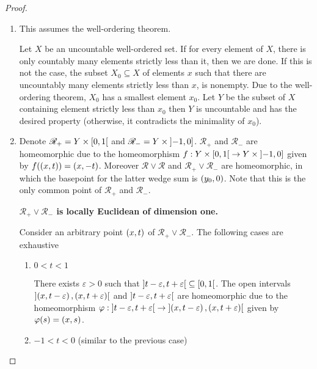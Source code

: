\begin{proof}
	\begin{enumerate}[label={(\alph*)}]
		\item This assumes the well-ordering theorem.

		      Let $X$ be an uncountable well-ordered set. If for every element of $X$, there is only countably many elements strictly less than it, then we are done. If this is not the case, the subset $X_{0}\subseteq X$ of elements $x$ such that there are uncountably many elements strictly less than $x$, is nonempty. Due to the well-ordering theorem, $X_{0}$ has a smallest element $x_{0}$. Let $Y$ be the subset of $X$ containing element strictly less than $x_{0}$ then $Y$ is uncountable and has the desired property (otherwise, it contradicts the minimality of $x_{0}$).
		\item Denote $\mathscr{R}_{+} = Y \times \left[{0, 1}\right[$ and $\mathscr{R}_{-} = Y \times \left]{-1, 0}\right]$. $\mathscr{R}_{+}$ and $\mathscr{R}_{-}$ are homeomorphic due to the homeomorphism $f: Y \times \left[{0, 1}\right[ \to Y \times \left]{-1, 0}\right]$ given by $f(\left({x, t}\right)) = \left({x, -t}\right)$. Moreover $\mathscr{R} \vee \mathscr{R}$ and $\mathscr{R}_{+} \vee \mathscr{R}_{-}$ are homeomorphic, in which the basepoint for the latter wedge sum is $\left({y_{0}, 0}\right)$. Note that this is the only common point of $\mathscr{R}_{+}$ and $\mathscr{R}_{-}$.

		      \textbf{$\mathscr{R}_{+} \vee \mathscr{R}_{-}$ is locally Euclidean of dimension one.}

		      Consider an arbitrary point $\left({x, t}\right)$ of $\mathscr{R}_{+} \vee \mathscr{R}_{-}$. The following cases are exhaustive
		      \begin{enumerate}[label={\textbf{Case \arabic*.}},itemindent=1cm]
			      \item $0 < t < 1$

			            There exists $\varepsilon > 0$ such that $\left]{t - \varepsilon, t + \varepsilon}\right[ \subseteq \left[{0, 1}\right[$. The open intervals $\left]{\left({x, t - \varepsilon}\right), \left({x, t + \varepsilon}\right)}\right[$ and $\left]{t - \varepsilon, t + \varepsilon}\right[$ are homeomorphic due to the homeomorphism $\varphi: \left]{t - \varepsilon, t + \varepsilon}\right[ \to \left]{\left({x, t - \varepsilon}\right), \left({x, t + \varepsilon}\right)}\right[$ given by $\varphi(s) = \left({x, s}\right)$.
			      \item $-1 < t < 0$ (similar to the previous case)


\end{enumerate}
\end{enumerate}
\end{proof}
